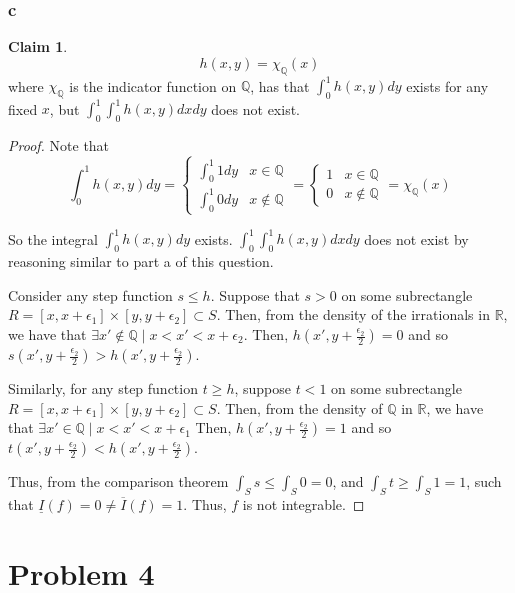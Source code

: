 \documentclass[12pt,letterpaper]{article}
\theoremstyle{definition}
\newtheorem*{claim}{Claim}
\newcommand{\R}{\mathbb{R}}
\newcommand{\Q}{\mathbb{Q}}
\begin{document}
\subsubsection*{c}

\begin{claim}
  \[
    h(x,y) = \chi_\Q(x)
  \]
  where $\chi_\Q$ is the indicator function on $\Q$,
  has that $\int_0^1h(x,y)dy$ exists for any fixed $x$, but
  $\int_0^1\int_0^1h(x,y)dxdy$ does not exist.
\end{claim}

\begin{proof}
  Note that
  \[
    \int_0^1h(x,y)dy =
    \begin{cases}
      \int_0^1 1 dy & x \in \Q \\
      \int_0^1 0 dy & x \notin \Q
    \end{cases} =
    \begin{cases}
      1 & x \in \Q \\
      0 & x \notin \Q
    \end{cases} = \chi_\Q(x)
  \] 

  So the integral $\int_0^1h(x,y)dy$ exists. 
  $\int_0^1\int_0^1h(x,y)dxdy$ does not exist by reasoning similar to part a of
  this question.

  Consider any step function $s \leq h$. Suppose that $s > 0$ on some
  subrectangle $R = [x,x + \epsilon_1] \times [y,y + \epsilon_2] \subset S$.
  Then, from the density of the irrationals in $\R$, we have that $\exists x'
  \notin \Q \mid x < x' < x + \epsilon_2$. Then,
  $h(x',y + \frac{\epsilon_2}{2}) = 0$ and so $s(x',y + \frac{\epsilon_2}{2}) >
  h(x',y + \frac{\epsilon_2}{2})$.

  Similarly, for any step function $t \geq h$, suppose $t < 1$ on some
  subrectangle $R = [x,x + \epsilon_1] \times [y,y + \epsilon_2] \subset S$.
  Then, from the density of $\Q$ in $\R$, we have that $\exists x'
  \in \Q \mid x < x' < x + \epsilon_1$ Then,
  $h(x',y + \frac{\epsilon_2}{2}) = 1$ and so $t(x',y + \frac{\epsilon_2}{2}) < h(x',y + \frac{\epsilon_2}{2})$.

  Thus, from the comparison theorem $\int_S s \leq \int_S 0 = 0$, and $\int_S t
  \geq \int_S 1 = 1$, such that $\underline{I}(f) = 0 \neq \overline{I}(f) = 1$.
  Thus, $f$ is not integrable.
\end{proof}

\section*{Problem 4}
\end{document}
